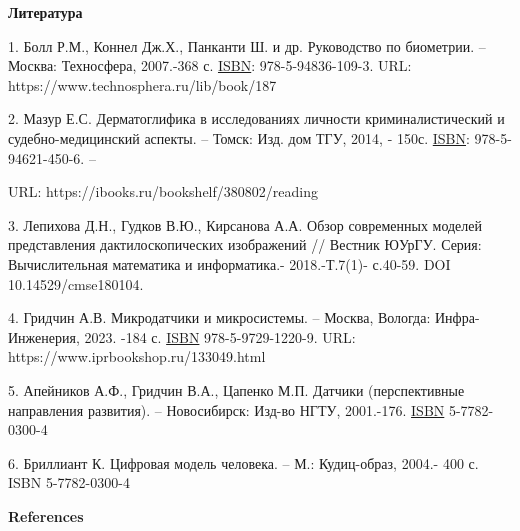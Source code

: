 \begin{center}
{\bfseries Литература}
\end{center}

\begin{references}
1. Болл Р.М., Коннел Дж.Х., Панканти Ш. и др. Руководство по биометрии.
-- Москва: Техносфера, 2007.-368 с.
\href{https://www.libex.ru/qna/ref/isbn/}{ISBN}: 978-5-94836-109-3.
URL: https://www.technosphera.ru/lib/book/187

2. Мазур Е.С. Дерматоглифика в исследованиях личности криминалистический
и судебно-медицин\-ский аспекты. -- Томск: Изд. дом ТГУ, 2014, - 150с.
\href{https://www.libex.ru/qna/ref/isbn/}{ISBN}: 978-5-94621-450-6. --

URL: https://ibooks.ru/bookshelf/380802/reading

3. Лепихова Д.Н., Гудков В.Ю., Кирсанова А.А. Обзор современных моделей
представления дактилоскопических изображений // Вестник ЮУрГУ. Серия:
Вычислительная математика и информатика.- 2018.-Т.7(1)- с.40-59.
DOI 10.14529/cmse180104.

4. Гридчин А.В. Микродатчики и микросистемы. -- Москва, Вологда:
Инфра-Инженерия, 2023. -184 с. \href{https://www.libex.ru/qna/ref/isbn/}{ISBN} 978-5-9729-1220-9.
URL: https://www.iprbookshop.ru/133049.html

5. Апейников А.Ф., Гридчин В.А., Цапенко М.П. Датчики (перспективные
направления развития). -- Новосибирск: Изд-во НГТУ, 2001.-176.
\href{https://www.libex.ru/qna/ref/isbn/}{ISBN} 5-7782-0300-4

6. Бриллиант К. Цифровая модель человека. -- М.: Кудиц-образ, 2004.- 400
с. ISBN 5-7782-0300-4
\end{references}

\begin{center}
{\bfseries References}
\end{center}


